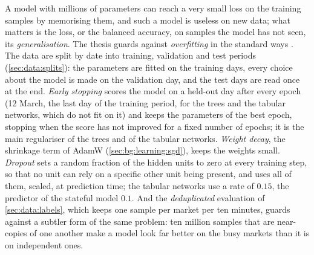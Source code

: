 A model with millions of parameters can reach a very small loss on the training samples
by memorising them, and such a model is useless on new data; what matters is the loss, or
the balanced accuracy, on samples the model has not seen, its \emph{generalisation}.  The
thesis guards against \emph{overfitting} in the standard ways \cite{goodfellow2016deep}.
The data are split by date into training, validation and test periods
(\cref{sec:data:splits}): the parameters are fitted on the training days, every choice
about the model is made on the validation day, and the test days are read once at the end.
\emph{Early stopping} scores the model on a held-out day after every epoch (12 March, the
last day of the training period, for the trees and the tabular networks, which do not fit
on it) and keeps the parameters of the best epoch, stopping
when the score has not improved for a fixed number of epochs; it is the main regulariser
of the trees and of the tabular networks.  \emph{Weight decay}, the shrinkage
term of AdamW (\cref{sec:bg:learning:sgd}), keeps the weights small.  \emph{Dropout} \cite{srivastava2014dropout}
sets a random fraction of the hidden units to zero at every training step, so that no unit
can rely on a specific other unit being present, and uses all of them, scaled, at
prediction time; the tabular networks use a rate of $0.15$, the predictor of the stateful
model $0.1$.  And the \emph{deduplicated} evaluation of \cref{sec:data:labels}, which
keeps one sample per market per ten minutes, guards against a subtler form of the
same problem: ten million samples that are near-copies of one another make a model look
far better on the busy markets than it is on independent ones.
